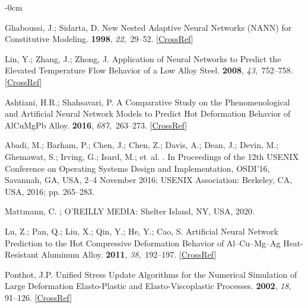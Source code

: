 \documentclass[algorithms,article,accept,pdftex,oneauthors]{Definitions/mdpi}
\begin{document}
\begin{adjustwidth}{-\extralength}{0cm}
\begin{thebibliography}{999}
Ghaboussi, J.; Sidarta, D.
\newblock New Nested Adaptive Neural Networks ({{NANN}}) for Constitutive
Modeling.
 {\bf 1998}, {\em 22},~29--52. [\href{http://dx.doi.org/10.1016/S0266-352X(97)00034-7}{CrossRef}]

Lin, Y.; Zhang, J.; Zhong, J.
\newblock Application of Neural Networks to Predict the Elevated Temperature
Flow Behavior of a Low Alloy Steel.
 {\bf 2008}, {\em 43},~752--758. [\href{http://dx.doi.org/10.1016/j.commatsci.2008.01.039}{CrossRef}]

Ashtiani, H.R.; Shahsavari, P.
\newblock A Comparative Study on the Phenomenological and Artificial Neural
Network Models to Predict Hot Deformation Behavior of {{AlCuMgPb}} Alloy.
 {\bf 2016}, {\em
687},~263--273. [\href{http://dx.doi.org/10.1016/j.jallcom.2016.04.300}{CrossRef}]

Abadi, M.; Barham, P.; Chen, J.; Chen, Z.; Davis, A.; Dean, J.; Devin, M.;
Ghemawat, S.; Irving, G.; Isard, M.;  et~al.
.
\newblock In Proceedings of the 12th {{USENIX}} Conference
on {{Operating Systems Design}} and {{Implementation}}, {OSDI}'16, {Savannah, GA, USA, 2--4 November 2016;}
{USENIX Association: Berkeley, CA, }
{USA}, 2016; pp. 265--283.

Mattmann, C.
; {O'REILLY MEDIA}: Shelter Island, NY, USA,  2020.

Lu, Z.; Pan, Q.; Liu, X.; Qin, Y.; He, Y.; Cao, S.
\newblock Artificial Neural Network Prediction to the Hot Compressive
Deformation Behavior of {{Al}}--{{Cu}}--{{Mg}}--{{Ag}} Heat-Resistant
Aluminum Alloy.
 {\bf 2011}, {\em
38},~192--197. [\href{http://dx.doi.org/10.1016/j.mechrescom.2011.02.015}{CrossRef}]

Ponthot, J.P.
\newblock Unified Stress Update Algorithms for the Numerical Simulation of
Large Deformation Elasto-Plastic and Elasto-Viscoplastic Processes.
 {\bf 2002}, \emph{18}, 91--126. [\href{http://dx.doi.org/10.1016/S0749-6419(00)00097-8}{CrossRef}]


\end{thebibliography}
\end{adjustwidth}
\end{document}
